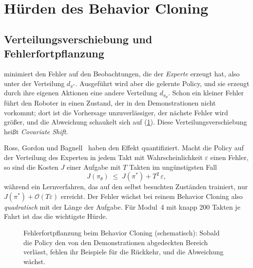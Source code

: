 \section{Hürden des Behavior Cloning}
\label{sec:huerden}

\subsection{Verteilungsverschiebung und Fehlerfortpflanzung}
\label{sec:covariate-shift}

 minimiert den Fehler auf den Beobachtungen, die der \emph{Experte}
erzeugt hat, also unter der Verteilung $d_{\pi^{*}}$. Ausgeführt wird aber die gelernte
Policy, und sie erzeugt durch ihre eigenen Aktionen eine andere Verteilung $d_{\pi_\theta}$.
Schon ein kleiner Fehler führt den Roboter in einen Zustand, der in den Demonstrationen nicht
vorkommt; dort ist die Vorhersage unzuverlässiger, der nächste Fehler wird größer, und die
Abweichung schaukelt sich auf (\cref{fig:drift}). Diese Verteilungsverschiebung heißt
\emph{Covariate Shift}.

Ross, Gordon und Bagnell~\cite{ross2011} haben den Effekt quantifiziert. Macht die Policy
auf der Verteilung des Experten in jedem Takt mit Wahrscheinlichkeit $\varepsilon$ einen
Fehler, so sind die Kosten $J$ einer Aufgabe mit $T$ Takten im ungünstigsten Fall
\begin{equation}
  J(\pi_\theta) \;\le\; J(\pi^{*}) + T^{2}\,\varepsilon ,
  \label{eq:ross}
\end{equation}
während ein Lernverfahren, das auf den selbst besuchten Zuständen trainiert, nur
$J(\pi^{*}) + \mathcal{O}(T\varepsilon)$ erreicht. Der Fehler wächst bei reinem Behavior
Cloning also \emph{quadratisch} mit der Länge der Aufgabe. Für Modul~4 mit knapp 200 Takten je
Fahrt ist das die wichtigste Hürde.

\begin{figure}[htbp]
  \centering
  \caption[Fehlerfortpflanzung beim Behavior Cloning]{Fehlerfortpflanzung beim Behavior
  Cloning (schematisch): Sobald die Policy den von den Demonstrationen abgedeckten Bereich
  verlässt, fehlen ihr Beispiele für die Rückkehr, und die Abweichung wächst.}
  \label{fig:drift}
\end{figure}

